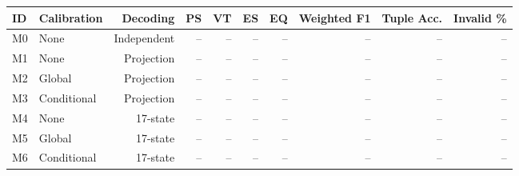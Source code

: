 \begin{tabular}{llrrrrrrrr}
\toprule
ID & Calibration & Decoding & PS & VT & ES & EQ & Weighted F1 & Tuple Acc. & Invalid \% \\
\midrule
M0 & None & Independent & -- & -- & -- & -- & -- & -- & -- \\
M1 & None & Projection & -- & -- & -- & -- & -- & -- & -- \\
M2 & Global & Projection & -- & -- & -- & -- & -- & -- & -- \\
M3 & Conditional & Projection & -- & -- & -- & -- & -- & -- & -- \\
M4 & None & 17-state & -- & -- & -- & -- & -- & -- & -- \\
M5 & Global & 17-state & -- & -- & -- & -- & -- & -- & -- \\
M6 & Conditional & 17-state & -- & -- & -- & -- & -- & -- & -- \\
\bottomrule
\end{tabular}
